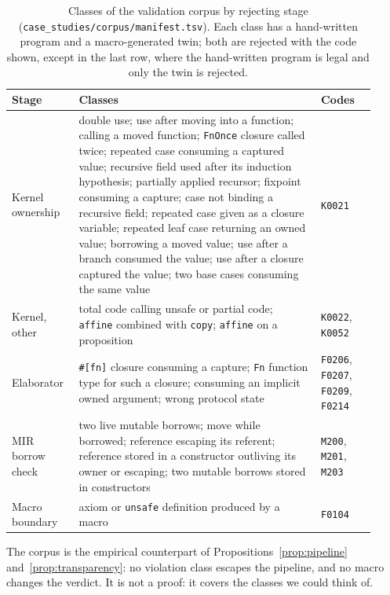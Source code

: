 \begin{table}[t]
\centering\footnotesize
\caption{Classes of the validation corpus by rejecting stage (\texttt{case\_studies/corpus/manifest.tsv}). Each class has a hand-written program and a macro-generated twin; both are rejected with the code shown, except in the last row, where the hand-written program is legal and only the twin is rejected.}
\label{tab:corpus}
\begin{tabular}{p{0.16\linewidth}p{0.62\linewidth}p{0.14\linewidth}}\hline
\textbf{Stage} & \textbf{Classes} & \textbf{Codes}\\\hline\hline
Kernel ownership & double use; use after moving into a function; calling a moved function; \lstinline|FnOnce| closure called twice; repeated case consuming a captured value; recursive field used after its induction hypothesis; partially applied recursor; fixpoint consuming a capture; case not binding a recursive field; repeated case given as a closure variable; repeated leaf case returning an owned value; borrowing a moved value; use after a branch consumed the value; use after a closure captured the value; two base cases consuming the same value & \texttt{K0021}\\
Kernel, other & total code calling unsafe or partial code; \lstinline|affine| combined with \lstinline|copy|; \lstinline|affine| on a proposition & \texttt{K0022}, \texttt{K0052}\\
Elaborator & \lstinline|#[fn]| closure consuming a capture; \lstinline|Fn| function type for such a closure; consuming an implicit owned argument; wrong protocol state & \texttt{F0206}, \texttt{F0207}, \texttt{F0209}, \texttt{F0214}\\
MIR borrow check & two live mutable borrows; move while borrowed; reference escaping its referent; reference stored in a constructor outliving its owner or escaping; two mutable borrows stored in constructors & \texttt{M200}, \texttt{M201}, \texttt{M203}\\
Macro boundary & axiom or \lstinline|unsafe| definition produced by a macro & \texttt{F0104}\\\hline
\end{tabular}
\end{table}

The corpus is the empirical counterpart of Propositions~\ref{prop:pipeline} and~\ref{prop:transparency}: no violation class escapes the pipeline, and no macro changes the verdict.
It is not a proof: it covers the classes we could think of.

